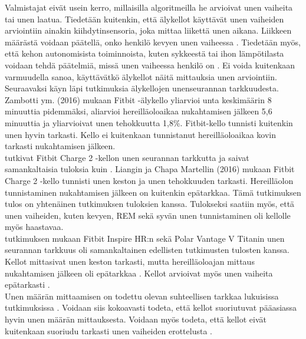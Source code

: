 \documentclass[utf8,bachelor,finnish]{bachelor}
\begin{document}
  Valmistajat eivät usein kerro, millaisilla algoritmeilla he arvioivat unen vaiheita tai unen laatua.
   Tiedetään kuitenkin, että älykellot käyttävät unen vaiheiden arviointiin ainakin kiihdytinsensoria, joka mittaa liikettä unen aikana. Liikkeen määrästä voidaan
    päätellä, onko henkilö kevyen unen vaiheessa \parencite{grifantini_hows_2014,de_zambotti_measures_2016}.
     Tiedetään myös, että kehon autonomisista toiminnoista, kuten sykkeestä tai ihon lämpötilasta voidaan tehdä päätelmiä, missä
      unen vaiheessa henkilö on \parencite{de_zambotti_measures_2016, fonseca_sleep_2015}. Ei voida kuitenkaan varmuudella sanoa, käyttävätkö älykellot näitä mittauksia unen arviointiin.
       Seuraavaksi käyn läpi tutkimuksia älykellojen unenseurannan tarkkuudesta.\\
    
       

   Zambotti ym. (2016) mukaan Fitbit -älykello yliarvioi unta keskimäärin
    8 minuuttia pidemmäksi, aliarvioi hereilläoloaikaa nukahtamisen jälkeen 5,6 minuuttia ja yliarvioivat unen tehokkuutta 1,8\%.
     Fitbit-kello tunnisti kuitenkin unen hyvin tarkasti.
      Kello ei kuitenkaan tunnistanut hereilläoloaikaa kovin tarkasti nukahtamisen jälkeen.\\
  
  \textcite{liang2018validity} tutkivat Fitbit Charge 2 -kellon unen seurannan tarkkutta ja saivat samankaltaisia tuloksia
   kuin \textcite{de_zambotti_measures_2016}. Liangin ja Chapa Martellin (2016) mukaan Fitbit Charge 2 -kello tunnisti unen keston
    ja unen tehokkuuden tarkasti. Hereilläolon tunnistaminen nukahtamisen jälkeen on kuitenkin
     epätarkkaa. Tämä tutkimuksen tulos on yhtenäinen \textcite{de_zambotti_measures_2016} tutkimuksen tuloksien kanssa.
      Tulokseksi saatiin myös, että unen vaiheiden, kuten kevyen, REM sekä syvän unen tunnistaminen oli kellolle myös haastavaa.\\
  
  \textcite{chinoy_performance_2022} tutkimuksen mukaan Fitbit Inspire HR:n sekä Polar Vantage V Titanin unen seurannan tarkkuus oli 
    samankaltainen edellisten tutkimusten tulosten kanssa. Kellot mittasivat unen keston tarkasti,
     mutta hereilläoloajan mittaus nukahtamisen jälkeen oli epätarkkaa \parencite{chinoy_performance_2022}.
      Kellot arvioivat myös unen vaiheita epätarkasti \parencite{chinoy_performance_2022}.\\
  
  Unen määrän mittaamisen on todettu olevan suhteellisen tarkkaa lukuisissa tutkimuksissa
   \parencite{de_zambotti_measures_2016,liang2018validity,chinoy_performance_2022,miller_validation_2022}. Voidaan siis kokoavasti todeta, että kellot suoriutuvat
    pääasiassa hyvin unen määrän mittauksesta. Voidaan myös todeta, että kellot eivät kuitenkaan suoriudu tarkasti unen vaiheiden erottelusta
     \parencite{chinoy_performance_2022,de_zambotti_measures_2016,liang2018validity}.
       
\end{document}
